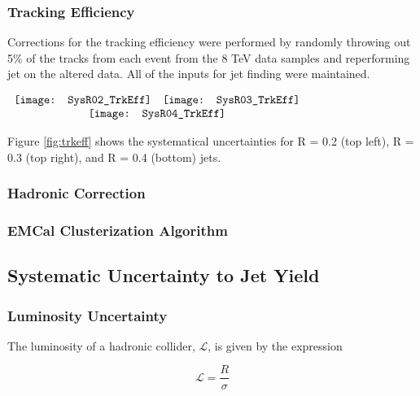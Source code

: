 \subsubsection{Tracking Efficiency}
Corrections for the tracking efficiency were performed by randomly throwing out 5\% of the tracks from each event from the 8 TeV data samples and reperforming jet on the altered data.  All of the inputs for jet finding were maintained.


\begin{figure*}[t!]
$\begin{array}{rl}
    \texttt{[image: SysR02\_TrkEff]} &
    \texttt{[image: SysR03\_TrkEff]}\\
    \multicolumn{2}{c}{\texttt{[image: SysR04\_TrkEff]}}
\end{array}$
\caption[Systematic due to TPC tracking efficiency.]{\label{fig:trkeff}Systematic due to TPC tracking efficiency.}
\end{figure*}

\noindent
Figure \ref{fig:trkeff} shows the systematical uncertainties for R = 0.2 (top left), R = 0.3 (top right), and R = 0.4 (bottom) jets.   

\subsubsection{Hadronic Correction}

\subsubsection{EMCal Clusterization Algorithm}
\subsection{Systematic Uncertainty to Jet Yield}



\subsubsection{Luminosity Uncertainty}

The luminosity of a hadronic collider, $\mathscr{L}$, is given by the expression



\begin{equation}
\mathscr{L} = \frac{R}{\sigma}
\label{eq:xlumdef}
\end{equation}

